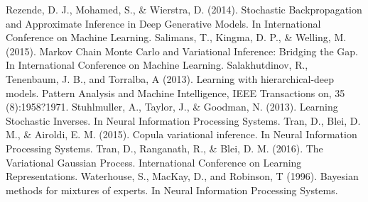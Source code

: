 \documentclass{article}
\begin{document}
Rezende, D. J., Mohamed, S., \& Wierstra, D. (2014). Stochastic Backpropagation and Approximate Inference in Deep Generative Models. In International Conference on Machine Learning.
Salimans, T., Kingma, D. P., \& Welling, M. (2015). Markov Chain Monte Carlo and Variational Inference: Bridging the Gap. In International Conference on Machine Learning.
Salakhutdinov, R., Tenenbaum, J. B., and Torralba, A (2013). Learning with hierarchical-deep models. Pattern Analysis and Machine Intelligence, IEEE Transactions on, 35 (8):1958?1971.
Stuhlmuller, A., Taylor, J., \& Goodman, N. (2013). Learning Stochastic Inverses. In Neural Information Processing Systems.
Tran, D., Blei, D. M., \& Airoldi, E. M. (2015). Copula variational inference. In Neural Information Processing Systems.
Tran, D., Ranganath, R., \& Blei, D. M. (2016). The Variational Gaussian Process. International Conference on Learning Representations.
Waterhouse, S., MacKay, D., and Robinson, T (1996). Bayesian methods for mixtures of experts. In Neural Information Processing Systems.
\end{document}
